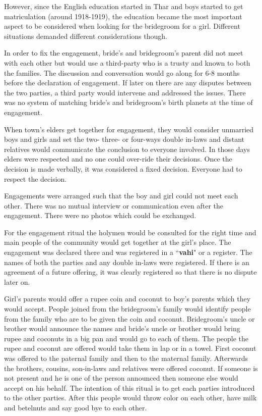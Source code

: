However, since the English education started in Thar and boys started to get
matriculation (around 1918-1919), the education became the most important
aspect to be considered when looking for the bridegroom for a girl. Different
situations demanded different considerations though.

In order to fix the engagement, bride's and bridegroom's parent did not meet with
each other but would use a third-party who is a trusty and known to both the
families. The discussion and conversation would go along for 6-8 months before
the declaration of engagement. If later on there are any disputes between the
two parties, a third party would intervene and addressed the issues. There was
no system of matching bride's and bridegroom's birth planets at the time of
engagement.

When town's elders get together for engagement, they would consider unmarried
boys and girls and set the two- three- or four-ways double in-laws and distant
relatives would communicate the conclusion to everyone involved. In those days
elders were respected and no one could over-ride their decisions. Once the
decision is made verbally, it was considered a fixed decision. Everyone had to
respect the decision.

Engagements were arranged such that the boy and girl could not meet each other.
There was no mutual interview or communication even after the engagement. There
were no photos which could be exchanged.

For the engagement ritual the holymen would be consulted for the right time and
main people of the community would get together at the girl's place. The
engagement was declared there and was registered in a ``\textbf{vahi}" or a
register. The names of both the parties and any double in-laws were registered.
If there is an agreement of a future offering, it was clearly registered so
that there is no dispute later on.

Girl's parents would offer a rupee coin and coconut to boy's parents which they
would accept. People joined from the bridegroom's family would identify people from
the family who are to be given the coin and coconut. Bridegroom's uncle or brother
would announce the names and bride's uncle or brother would bring rupee and
coconuts in a big pan and would go to each of them. The people the rupee and
coconut are offered would take them in lap or in a towel. First coconut was
offered to the paternal family and then to the maternal family. Afterwards the
brothers, cousins, son-in-laws and relatives were offered coconut. If someone
is not present and he is one of the person announced then someone else would
accept on his behalf. The intention of this ritual is to get each parties
introduced to the other parties. After this people would throw color on each
other, have milk and betelnuts and say good bye to each other.

